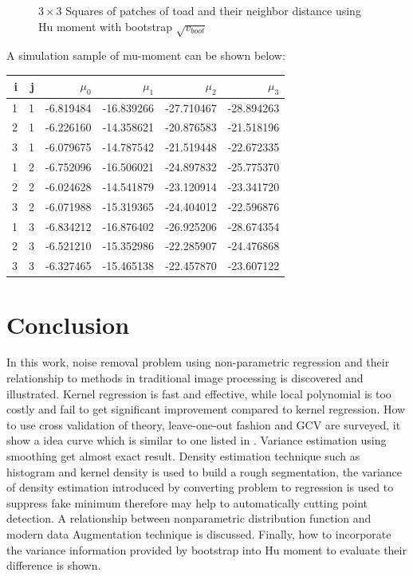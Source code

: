 \documentclass{article}
\begin{document}
\begin{figure}[htb]
  \centering
  
  \caption{$3 \times 3$ Squares of patches of toad and their neighbor distance using Hu moment with bootstrap $\sqrt{v_{boot}}$}
  \label{fig:square33}
\end{figure}

A simulation sample of mu-moment can be shown below:

\begin{tabular}{rrrrrr}
  \toprule
   i &  j &      $\mu_0$ &       $\mu_1$ &       $\mu_2$ &       $\mu_3$ \\
  \midrule
   1 &  1 & -6.819484 & -16.839266 & -27.710467 & -28.894263 \\
   2 &  1 & -6.226160 & -14.358621 & -20.876583 & -21.518196 \\
   3 &  1 & -6.079675 & -14.787542 & -21.519448 & -22.672335 \\
   1 &  2 & -6.752096 & -16.506021 & -24.897832 & -25.775370 \\
   2 &  2 & -6.024628 & -14.541879 & -23.120914 & -23.341720 \\
   3 &  2 & -6.071988 & -15.319365 & -24.404012 & -22.596876 \\
   1 &  3 & -6.834212 & -16.876402 & -26.925206 & -28.674354 \\
   2 &  3 & -6.521210 & -15.352986 & -22.285907 & -24.476868 \\
   3 &  3 & -6.327465 & -15.465138 & -22.457870 & -23.607122 \\
  \bottomrule
\end{tabular}

\section{Conclusion}

In this work, noise removal problem using non-parametric regression and 
their relationship to methods in traditional image processing is discovered and illustrated. 
Kernel regression is fast and effective, 
while local polynomial is too costly and fail to get significant improvement compared to kernel regression. 
How to use cross validation of theory, leave-one-out fashion and GCV are surveyed, 
it show a idea curve which is similar to one listed in \cite{wasserman2006all}. 
Variance estimation using smoothing get almost exact result. 
Density estimation technique such as histogram and kernel density is used to build a rough segmentation, 
the variance of density estimation introduced by converting problem to regression 
is used to suppress fake minimum therefore may help to automatically cutting point detection. 
A relationship between nonparametric distribution function and modern data Augmentation technique is discussed.
Finally, how to incorporate the variance information provided by bootstrap into Hu moment 
to evaluate their difference is shown.
\end{document}
